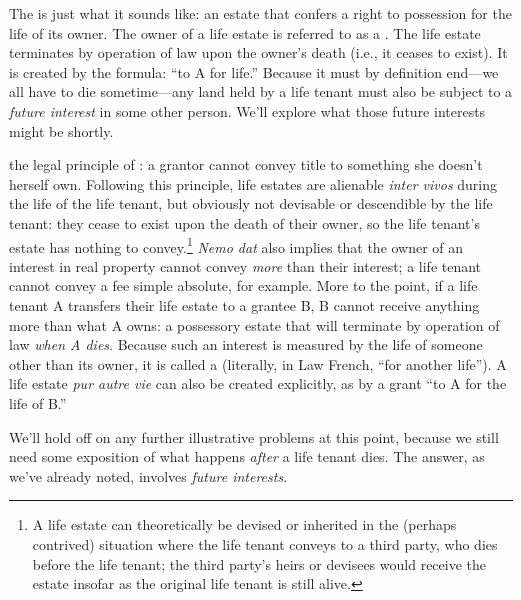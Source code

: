 The  is just what it sounds like: an estate that confers a
right to possession for the life of its owner. The owner of a life estate is
referred to as a . The life estate terminates by operation
of law upon the owner's death (i.e., it ceases to exist). It is created by the
formula: ``to A for life.'' Because it must by definition end---we all have to
die sometime---any land held by a life tenant must also be subject to a
\textit{future interest} in some other person. We'll explore what those future
interests might be shortly.

the legal principle of
%
:
a grantor cannot convey title to something she doesn't herself own.
Following this principle, life estates are alienable \textit{inter vivos}
during the life of the life tenant, but obviously not devisable or
descendible by the life tenant: they cease to exist upon the death of their
owner, so the life
tenant's estate has nothing to convey.\footnote{A life estate can theoretically
be devised or inherited in the (perhaps contrived) situation where the life
tenant conveys to a third party, who dies before the life tenant; the third
party's heirs or devisees would receive the estate insofar as the original life
tenant is still alive.}
\textit{Nemo dat} also implies that the
owner of an interest in real property cannot convey \textit{more} than their
interest; a life tenant cannot convey a fee simple absolute, for example. More
to the point, if a life tenant A transfers their life estate to a grantee B, B
cannot receive anything more than what A owns: a possessory estate that will
terminate by operation of law \textit{when A dies}. Because such an interest is
measured by the life of someone other than its owner, it is called a
 (literally, in Law French, ``for another
life''). A life estate \textit{pur autre vie} can also be created explicitly,
as by a grant ``to A for the life of B.''

We'll hold off on any further illustrative problems at this point, because we
still need some exposition of what happens \textit{after} a life tenant dies.
The answer, as we've already noted, involves \textit{future interests}.

